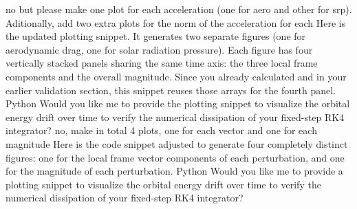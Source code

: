 {}\markdownRendererThematicBreak{}\markdownRendererInterblockSeparator
{}
\markdownRendererSectionEnd \markdownRendererSectionBegin
{}\markdownRendererInterblockSeparator
{}no but please make one plot for each acceleration (one for aero and other for srp). Aditionally, add two extra plots for the norm of the acceleration for each\markdownRendererInterblockSeparator
{}
\markdownRendererSectionEnd \markdownRendererSectionBegin
{}\markdownRendererInterblockSeparator
{}Here is the updated plotting snippet. It generates two separate figures (one for aerodynamic drag, one for solar radiation pressure). Each figure has four vertically stacked panels sharing the same time axis: the three local frame components and the overall magnitude.\markdownRendererInterblockSeparator
{}Since you already calculated  and  in your earlier validation section, this snippet reuses those arrays for the fourth panel.\markdownRendererInterblockSeparator
{}Python\markdownRendererInterblockSeparator
{}\markdownRendererInterblockSeparator
{}Would you like me to provide the plotting snippet to visualize the orbital energy drift over time to verify the numerical dissipation of your fixed-step RK4 integrator?\markdownRendererInterblockSeparator
{}\markdownRendererThematicBreak{}\markdownRendererInterblockSeparator
{}
\markdownRendererSectionEnd \markdownRendererSectionBegin
{}\markdownRendererInterblockSeparator
{}no, make in total 4 plots, one for each vector and one for each magnitude\markdownRendererInterblockSeparator
{}
\markdownRendererSectionEnd \markdownRendererSectionBegin
{}\markdownRendererInterblockSeparator
{}Here is the code snippet adjusted to generate four completely distinct figures: one for the local frame vector components of each perturbation, and one for the magnitude of each perturbation.\markdownRendererInterblockSeparator
{}Python\markdownRendererInterblockSeparator
{}\markdownRendererInterblockSeparator
{}Would you like me to provide a plotting snippet to visualize the orbital energy drift over time to verify the numerical dissipation of your fixed-step RK4 integrator?\markdownRendererInterblockSeparator

